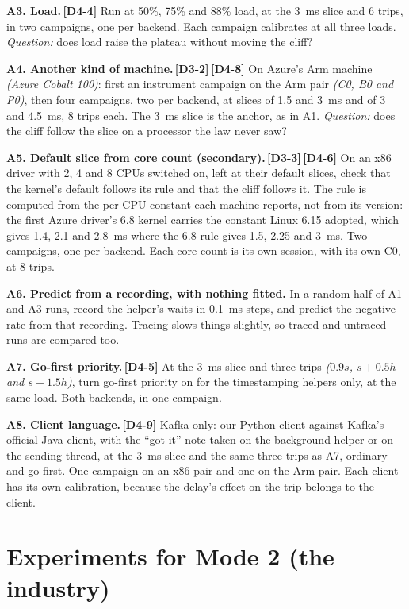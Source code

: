 \documentclass[11pt]{article}
\newcommand{\gl}[1]{{\color{soft}\itshape\small (#1)}}
\newcommand{\chgold}[1]{\,{\color{oldcol}\bfseries\footnotesize[#1]}}
\begin{document}
\textbf{A3. Load.}\chgold{D4-4} Run at 50\%, 75\% and 88\% load, at the 3~ms slice and 6 trips, in two campaigns, one per backend. Each campaign calibrates at all three loads. \emph{Question:} does load raise the plateau without moving the cliff?

\textbf{A4. Another kind of machine.}\chgold{D3-2}\chgold{D4-8} On Azure's Arm machine \gl{Azure Cobalt 100}: first an instrument campaign on the Arm pair \gl{C0, B0 and P0}, then four campaigns, two per backend, at slices of 1.5 and 3~ms and of 3 and 4.5~ms, 8 trips each. The 3~ms slice is the anchor, as in A1. \emph{Question:} does the cliff follow the slice on a processor the law never saw?

\textbf{A5. Default slice from core count (secondary).}\chgold{D3-3}\chgold{D4-6} On an x86 driver with 2, 4 and 8 CPUs switched on, left at their default slices, check that the kernel's default follows its rule and that the cliff follows it. The rule is computed from the per-CPU constant each machine reports, not from its version: the first Azure driver's 6.8 kernel carries the constant Linux 6.15 adopted, which gives 1.4, 2.1 and 2.8~ms where the 6.8 rule gives 1.5, 2.25 and 3~ms. Two campaigns, one per backend. Each core count is its own session, with its own C0, at 8 trips.

\textbf{A6. Predict from a recording, with nothing fitted.} In a random half of A1 and A3 runs, record the helper's waits in 0.1~ms steps, and predict the negative rate from that recording. Tracing slows things slightly, so traced and untraced runs are compared too.

\textbf{A7. Go-first priority.}\chgold{D4-5} At the 3~ms slice and three trips \gl{$0.9s$, $s + 0.5h$ and $s + 1.5h$}, turn go-first priority on for the timestamping helpers only, at the same load. Both backends, in one campaign.

\textbf{A8. Client language.}\chgold{D4-9} Kafka only: our Python client against Kafka's official Java client, with the ``got it'' note taken on the background helper or on the sending thread, at the 3~ms slice and the same three trips as A7, ordinary and go-first. One campaign on an x86 pair and one on the Arm pair. Each client has its own calibration, because the delay's effect on the trip belongs to the client.

\section{Experiments for Mode 2 (the industry)}
\end{document}

